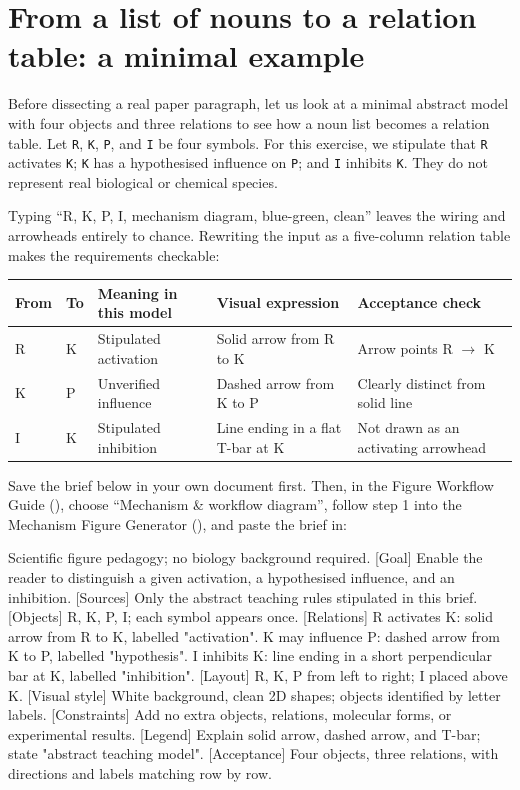 \section{From a list of nouns to a relation table: a minimal example}

Before dissecting a real paper paragraph, let us look at a minimal abstract model with four objects and three relations to see how a noun list becomes a relation table. Let \texttt{R}, \texttt{K}, \texttt{P}, and \texttt{I} be four symbols. For this exercise, we stipulate that \texttt{R} activates \texttt{K}; \texttt{K} has a hypothesised influence on \texttt{P}; and \texttt{I} inhibits \texttt{K}. They do not represent real biological or chemical species.

Typing ``R, K, P, I, mechanism diagram, blue-green, clean'' leaves the wiring and arrowheads entirely to chance. Rewriting the input as a five-column relation table makes the requirements checkable:

\begin{center}\small
\begin{tabularx}{\linewidth}{YYYYY}
\toprule
\textbf{From} & \textbf{To} & \textbf{Meaning in this model} & \textbf{Visual expression} & \textbf{Acceptance check} \\
\midrule
R & K & Stipulated activation & Solid arrow from R to K & Arrow points R \ensuremath{\rightarrow} K \\
K & P & Unverified influence & Dashed arrow from K to P & Clearly distinct from solid line \\
I & K & Stipulated inhibition & Line ending in a flat T-bar at K & Not drawn as an activating arrowhead \\
\bottomrule
\end{tabularx}
\end{center}

Save the brief below in your own document first. Then, in the \scidraw{} Figure Workflow Guide (), choose ``Mechanism \& workflow diagram'', follow step 1 into the Mechanism Figure Generator (), and paste the brief in:

\begin{Prompt}
 Scientific figure pedagogy; no biology background required.
[Goal] Enable the reader to distinguish a given activation, a hypothesised influence, and an inhibition.
[Sources] Only the abstract teaching rules stipulated in this brief.
[Objects] R, K, P, I; each symbol appears once.
[Relations]
R activates K: solid arrow from R to K, labelled "activation".
K may influence P: dashed arrow from K to P, labelled "hypothesis".
I inhibits K: line ending in a short perpendicular bar at K, labelled "inhibition".
[Layout] R, K, P from left to right; I placed above K.
[Visual style] White background, clean 2D shapes; objects identified by letter labels.
[Constraints] Add no extra objects, relations, molecular forms, or experimental results.
[Legend] Explain solid arrow, dashed arrow, and T-bar; state "abstract teaching model".
[Acceptance] Four objects, three relations, with directions and labels matching row by row.
\end{Prompt}

